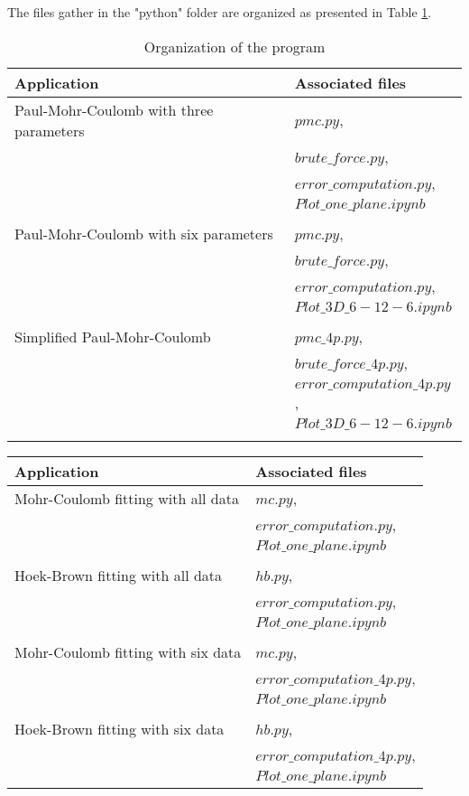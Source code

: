 The files gather in the "python" folder are organized as presented in Table \ref{tbC:files}.
\begin{table}[!b]
    \centering
    \caption{Organization of the program}
    \begin{tabular}{ll}
        \hline
        Application & Associated files\\
        \hline
        \hline
        Paul-Mohr-Coulomb with three parameters & $pmc.py$,\\
         & $brute\_force.py$, \\
         & $error\_computation.py$,\\
         & $Plot\_one\_plane.ipynb$\\
         \\
        Paul-Mohr-Coulomb with six parameters & $pmc.py$, \\
         & $brute\_force.py$, \\
         & $error\_computation.py$,\\
         & $Plot\_3D\_6-12-6.ipynb$\\
        \\
        Simplified Paul-Mohr-Coulomb & $pmc\_4p.py$,\\
        & $brute\_force\_4p.py$, \\
        & $error\_computation\_4p.py$,\\
        & $Plot\_3D\_6-12-6.ipynb$\\
       \\
    \end{tabular}
    \label{tbC:files}
\end{table}
\begin{table}
    \centering
    \begin{tabular}{ll}
        \hline
        Application & Associated files\\
        \hline
        \hline
        Mohr-Coulomb fitting with all data & $mc.py$, \\
         & $error\_computation.py$,\\
         & $Plot\_one\_plane.ipynb$\\
        \\
        Hoek-Brown fitting with all data & $hb.py$, \\
         & $error\_computation.py$,\\
         & $Plot\_one\_plane.ipynb$\\
        \\
        Mohr-Coulomb fitting with six data & $mc.py$, \\
         & $error\_computation\_4p.py$,\\
         & $Plot\_one\_plane.ipynb$\\
        \\
        Hoek-Brown fitting with six data & $hb.py$, \\
         & $error\_computation\_4p.py$,\\
         & $Plot\_one\_plane.ipynb$
    \end{tabular}
\end{table}


